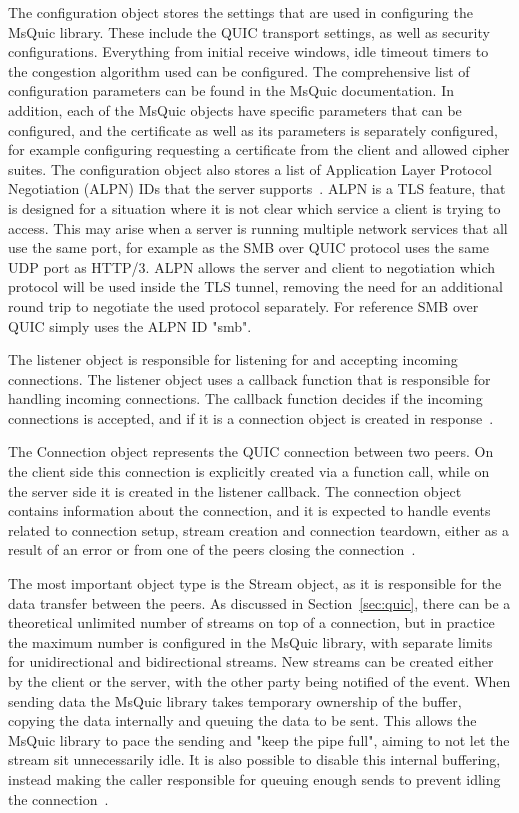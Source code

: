\documentclass[english, 12pt, a4paper, elec, utf8, a-2b, online]{aaltothesis}
\begin{document}
The configuration object stores the settings that are used in configuring the MsQuic
library. These include the QUIC transport settings, as well as security configurations. Everything
from initial receive windows, idle timeout timers to the congestion algorithm used
can be configured. The comprehensive list of configuration parameters can be found
in the MsQuic documentation. In addition, each of the MsQuic objects have specific
parameters that can be configured, and the certificate as well as its parameters
is separately configured, for example configuring requesting a certificate from the client
and allowed cipher suites. The configuration object also stores a list of
Application Layer Protocol Negotiation (ALPN) IDs that the server supports~\cite{msquic_docs}.
ALPN is a TLS feature, that is designed for a situation where it is not clear which
service a client is trying to access. This may arise when a server is running
multiple network services that all use the same port, for example as the SMB over
QUIC protocol uses the same UDP
port as HTTP/3. ALPN allows the server and client to negotiation which protocol
will be used inside the TLS tunnel, removing the need for an additional round trip to negotiate
the used protocol separately\cite{rfc7301}. For reference SMB over QUIC simply uses the ALPN ID "smb".

The listener object is responsible for listening for
and accepting incoming connections. The listener object uses a callback function
that is responsible for handling incoming connections. The callback function decides
if the incoming connections is accepted, and if it is a connection object is created
in response~\cite{msquic_docs}.

The Connection object represents the QUIC connection between two peers. On the client
side this connection is explicitly created via a function call, while on the server
side it is created in the listener callback. The connection object contains information
about the connection, and it is expected to handle events related to connection setup,
stream creation and connection teardown, either as a result of an error or from one
of the peers closing the connection~\cite{msquic_docs}.

The most important object type is the Stream object, as it is responsible for
the data transfer between the peers. As discussed in Section~\ref{sec:quic}, there
can be a theoretical unlimited number of streams on top of a connection, but in
practice the maximum number is configured in the MsQuic library, with separate
limits for unidirectional and bidirectional streams. New streams can be created
either by the client or the server, with the other party being notified of
the event. When sending data the MsQuic library takes temporary ownership of the
buffer, copying the data internally and queuing the data to be sent. This allows
the MsQuic library to pace the sending and "keep the pipe full", aiming to not let
the stream sit unnecessarily idle. It is also possible to disable this internal buffering,
instead making the caller responsible for queuing enough sends to prevent idling
the connection~\cite{msquic_docs}.
\end{document}
